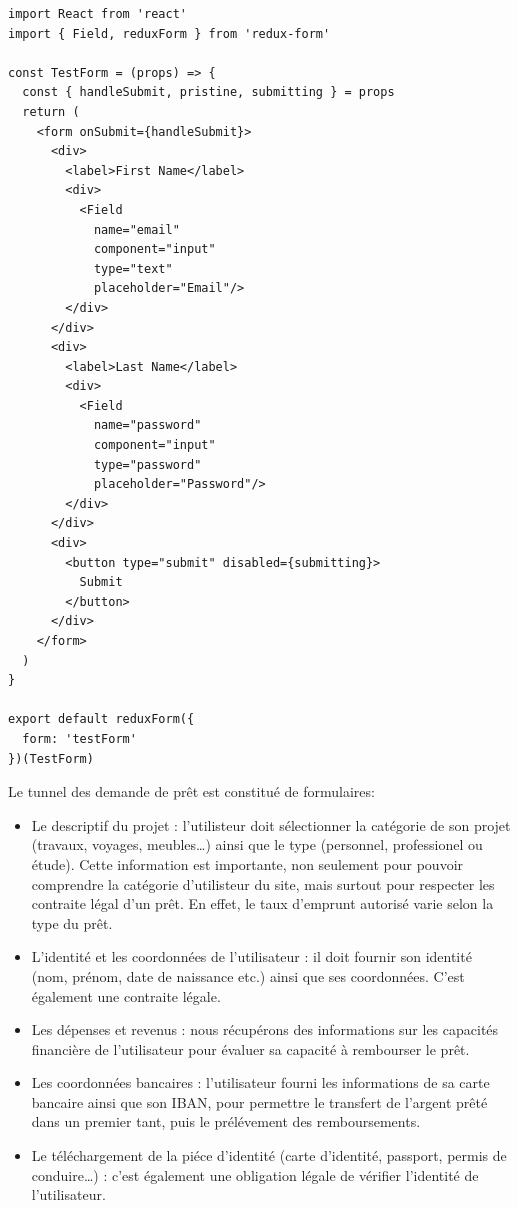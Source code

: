 \begin{verbatim}
import React from 'react'
import { Field, reduxForm } from 'redux-form'

const TestForm = (props) => {
  const { handleSubmit, pristine, submitting } = props
  return (
    <form onSubmit={handleSubmit}>
      <div>
        <label>First Name</label>
        <div>
          <Field
            name="email"
            component="input"
            type="text"
            placeholder="Email"/>
        </div>
      </div>
      <div>
        <label>Last Name</label>
        <div>
          <Field
            name="password"
            component="input"
            type="password"
            placeholder="Password"/>
        </div>
      </div>
      <div>
        <button type="submit" disabled={submitting}>
          Submit
        </button>
      </div>
    </form>
  )
}

export default reduxForm({
  form: 'testForm'
})(TestForm)
\end{verbatim}

\bigskip

Le tunnel des demande de prêt est constitué de formulaires:

\begin{itemize}
\tightlist
\item
  Le descriptif du projet : l'utilisteur doit sélectionner la catégorie
  de son projet (travaux, voyages, meubles\ldots{}) ainsi que le type
  (personnel, professionel ou étude). Cette information est importante,
  non seulement pour pouvoir comprendre la catégorie d'utilisteur du
  site, mais surtout pour respecter les contraite légal d'un prêt. En
  effet, le taux d'emprunt autorisé varie selon la type du prêt.
\item
  L'identité et les coordonnées de l'utilisateur : il doit fournir son
  identité (nom, prénom, date de naissance etc.) ainsi que ses
  coordonnées. C'est également une contraite légale.
\item
  Les dépenses et revenus : nous récupérons des informations sur les
  capacités financière de l'utilisateur pour évaluer sa capacité à
  rembourser le prêt.
\item
  Les coordonnées bancaires : l'utilisateur fourni les informations de
  sa carte bancaire ainsi que son IBAN, pour permettre le transfert de
  l'argent prêté dans un premier tant, puis le prélévement des
  remboursements.
\item
  Le téléchargement de la piéce d'identité (carte d'identité, passport,
  permis de conduire\ldots{}) : c'est également une obligation légale de
  vérifier l'identité de l'utilisateur.
\end{itemize}

